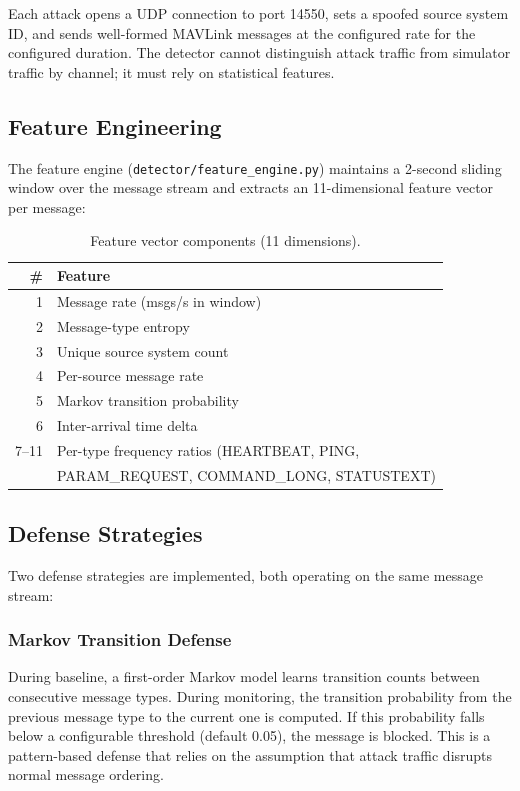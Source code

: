 Each attack opens a UDP connection to port 14550, sets a spoofed source
system ID, and sends well-formed MAVLink messages at the configured rate
for the configured duration.  The detector cannot distinguish attack
traffic from simulator traffic by channel; it must rely on statistical
features.

\subsection{Feature Engineering}

The feature engine (\texttt{detector/feature\_engine.py}) maintains a
2-second sliding window over the message stream and extracts an
11-dimensional feature vector per message:

\begin{table}[t]
\centering
\caption{Feature vector components (11 dimensions).}
\label{tab:features}
\begin{tabular}{rl}
\toprule
\# & \textbf{Feature} \\
\midrule
1  & Message rate (msgs/s in window) \\
2  & Message-type entropy \\
3  & Unique source system count \\
4  & Per-source message rate \\
5  & Markov transition probability \\
6  & Inter-arrival time delta \\
7--11 & Per-type frequency ratios (HEARTBEAT, PING, \\
   & PARAM\_REQUEST, COMMAND\_LONG, STATUSTEXT) \\
\bottomrule
\end{tabular}
\end{table}

\subsection{Defense Strategies}

Two defense strategies are implemented, both operating on the same
message stream:

\subsubsection{Markov Transition Defense}
During baseline, a first-order Markov model learns transition counts
between consecutive message types.  During monitoring, the transition
probability from the previous message type to the current one is
computed.  If this probability falls below a configurable threshold
(default 0.05), the message is blocked.  This is a pattern-based defense
that relies on the assumption that attack traffic disrupts normal
message ordering.

